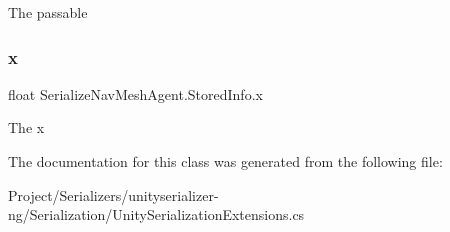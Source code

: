 The passable 

\mbox{\label{class_serialize_nav_mesh_agent_1_1_stored_info_a67ba07515a06b4bf79e95c9b312a49cc}} 
\subsubsection{\texorpdfstring{x}{x}}
{\footnotesize\ttfamily float Serialize\+Nav\+Mesh\+Agent.\+Stored\+Info.\+x}



The x 



The documentation for this class was generated from the following file\+:\begin{DoxyCompactItemize}
\item 
Project/\+Serializers/unityserializer-\/ng/\+Serialization/Unity\+Serialization\+Extensions.\+cs\end{DoxyCompactItemize}

